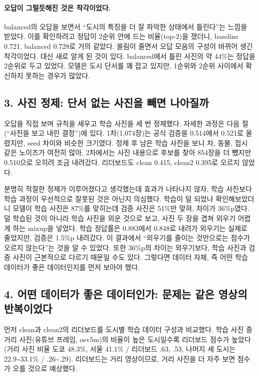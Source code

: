 \documentclass[11pt]{article}
\begin{document}
\paragraph{오답이 그럴듯해진 것은 착각이었다.} balanced의 오답을 보면서 ``도시의 특징을 더 잘 파악한 상태에서 틀린다''는 느낌을 받았다. 이를 확인하려고 정답이 2순위 안에 드는 비율(top-2)을 쟀더니, baseline 0.721, balanced 0.728로 거의 같았다. 쏠림이 줄면서 오답 모음의 구성이 바뀌어 생긴 착각이었다. 대신 새로 알게 된 것이 있다. balanced에서 틀린 사진의 약 44\%는 정답을 2순위로 두고 있었다. 모델은 도시 단서를 꽤 잡고 있지만, 1순위와 2순위 사이에서 확신하지 못하는 경우가 많았다.

\subsection*{3. 사진 정제: 단서 없는 사진을 빼면 나아질까}

오답을 직접 보며 규칙을 세우고 학습 사진을 세 번 정제했다. 자세한 과정은 다음 절(``사진을 보고 내린 결정'')에 있다. 1차(1,074장)는 공식 검증을 0.514에서 0.521로 올렸지만, seed 차이와 비슷한 크기였다. 정제 후 남은 학습 사진을 보니 차, 동물, 접시 같은 노이즈가 여전히 많아, 2차에서는 사진 내용으로 후보를 찾아 854장을 더 뺐지만 0.510으로 오히려 조금 내려갔다. 리더보드도 clean 0.415, clean2 0.395로 오르지 않았다.

분명히 적절한 정제가 이루어졌다고 생각했는데 효과가 나타나지 않자, 학습 사진보다 학습 과정이 우선적으로 잘못된 것은 아닌지 의심했다. 학습이 덜 되었나 확인해보았더니 모델이 학습 사진은 87\%를 맞히는데 검증 사진은 51\%만 맞혀, 차이가 36\%p였다. 덜 학습된 것이 아니라 학습 사진을 외운 것으로 보고, 사진 두 장을 겹쳐 외우기 어렵게 하는 mixup을 넣었다. 학습 정답률은 0.883에서 0.848로 내려가 외우기는 실제로 줄었지만, 검증은 1.5\%p 내려갔다. 이 결과에서 ``외우기를 줄이는 것만으로는 점수가 오르지 않는다''는 것을 알 수 있었다. 또한 36\%p의 차이는 외우기보다, 학습 사진과 검증 사진이 근본적으로 다르기 때문일 수도 있다. 그렇다면 데이터 자체, 즉 어떤 학습 데이터가 좋은 데이터인지를 먼저 보아야 했다.

\subsection*{4. 어떤 데이터가 좋은 데이터인가: 문제는 같은 영상의 반복이었다}

먼저 clean과 clean2의 리더보드를 도시별 학습 데이터 구성과 비교했다. 학습 사진 중 거리 사진(유튜브 프레임, osv5m)의 비율이 높은 도시일수록 리더보드 점수가 높았다(거리 사진 비율 도쿄 48.3\%, 서울 41.1\% / 리더보드 .63, .53, 나머지 세 도시는 22.9\textasciitilde 33.1\% / .26\textasciitilde .29). 리더보드는 거리 영상이므로, 거리 사진을 더 자주 보면 점수가 오를 것으로 예상했다.
\end{document}
